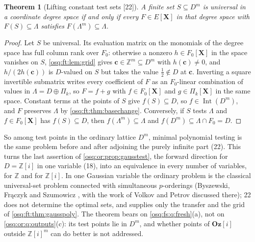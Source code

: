 \documentclass[11pt,letterpaper]{article}
\numberwithin{equation}{section}
\newtheorem{theorem}{Theorem}[section]
\theoremstyle{definition}
\theoremstyle{remark}
\theoremstyle{plain}
\newcommand{\Oz}{\mathbf{Oz}}
\newcommand{\GOz}{\Oz[i]}
\newcommand{\Z}{\mathbb Z}
\newcommand{\Int}{\operatorname{Int}}
\newcommand{\src}[1]{\textup{\textsf{[#1]}}}
\begin{document}
\begin{theorem}[Lifting constant test sets \src{22}]\label{osq:ft:thm:lifting}
A finite set $S\subseteq D^m$ is universal in a coordinate degree space if and only if every $F\in E[\mathbf X]$ in that degree space with
$F(S)\subseteq\Lambda$ satisfies $F(\Lambda^m)\subseteq\Lambda$.
\end{theorem}
\begin{proof}
Let $S$ be universal. Its evaluation matrix on the monomials of the degree space has full column rank over $F_0$: otherwise a nonzero
$h\in F_0[\mathbf X]$ in the space vanishes on $S$, \cref{osq:ft:lem:grid} gives $\mathbf c\in\Z^m\subseteq D^m$ with $h(\mathbf c)\ne0$, and
$h/(2h(\mathbf c))$ is $D$-valued on $S$ but takes the value $\frac12\notin D$ at $\mathbf c$. Inverting a square invertible submatrix writes every
coefficient of $F$ as an $F_0$-linear combination of values in $\Lambda=D\oplus\Pi_k$, so $F=f+g$ with $f\in F_0[\mathbf X]$ and
$g\in\Pi_k[\mathbf X]$ in the same space. Constant terms at the points of $S$ give $f(S)\subseteq D$, so $f\in\Int(D^m)$, and $F$ preserves $\Lambda$ by
\cref{osq:ft:thm:basechange}. Conversely, if $S$ tests $\Lambda$ and $f\in F_0[\mathbf X]$ has $f(S)\subseteq D$, then $f(\Lambda^m)\subseteq\Lambda$
and $f(D^m)\subseteq\Lambda\cap F_0=D$.
\end{proof}

So among test points in the ordinary lattice $D^m$, minimal polynomial testing is the same problem before and after adjoining the purely infinite part
(22). This turns the last assertion of \cref{osq:or:prop:gausstest}, the forward direction for $D=\Z[i]$ in one variable (18), into an equivalence in
every number of variables, for $\Z$ and for $\Z[i]$. In one Gaussian variable the ordinary problem is the classical universal-set problem connected with
simultaneous $p$-orderings (Byszewski, Fr\k aczyk and Szumowicz \cite{BFS}, with the work of Volkov and Petrov \cite{VP} discussed there); 22 does not
determine the optimal sets, and supplies only the transfer and the grid of \cref{osq:ft:thm:gausspoly}. The theorem bears on \cref{osq:fs:q:fresh}(a),
not on \cref{osq:or:q:outputs}(c): its test points lie in $D^m$, and whether points of $\GOz$ outside $\Z[i]^m$ can do better is not addressed.
\end{document}
